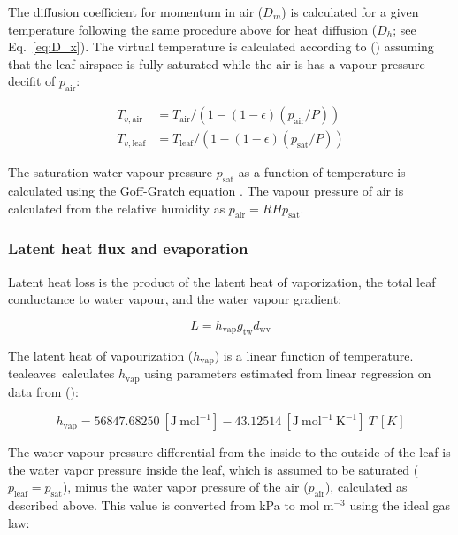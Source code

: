 \documentclass[11pt, oneside]{article}
\newcommand{\pkg}[1]{{\fontseries{b}\selectfont #1}}
\newcommand{\tealeaves}{\pkg{tealeaves}}
\begin{document}
The diffusion coefficient for momentum in air ($D_m$) is calculated for a given temperature following the same procedure above for heat diffusion ($D_h$; see Eq.~\ref{eq:D_x}). The virtual temperature is calculated according to \citeauthor{Monteith_Unsworth_2013} (\citeyear{Monteith_Unsworth_2013}) assuming that the leaf airspace is fully saturated while the air is has a vapour pressure decifit of $p_\mathrm{air}$:

\begin{align}
  T_{v, \mathrm{air}} & = T_\mathrm{air} / (1 - (1 - \epsilon) (p_\mathrm{air} / P)) \\
  T_{v, \mathrm{leaf}} & = T_\mathrm{leaf} / (1 - (1 - \epsilon) (p_\mathrm{sat} / P))
\end{align}

The saturation water vapour pressure $p_\mathrm{sat}$ as a function of temperature is calculated using the Goff-Gratch equation \citep{Vomel_2016}. The vapour pressure of air is calculated from the relative humidity as $p_\mathrm{air} = \mathit{RH} p_\mathrm{sat}$.

\subsubsection*{Latent heat flux and evaporation}

Latent heat loss is the product of the latent heat of vaporization, the total leaf conductance to water vapour, and the water vapour gradient:

\begin{equation}
  L = h_\mathrm{vap} g_\mathrm{tw} d_\mathrm{wv}
\end{equation}

The latent heat of vapourization ($h_\mathrm{vap}$) is a linear function of temperature. \tealeaves~calculates $h_\mathrm{vap}$ using parameters estimated from linear regression on data from \citeauthor{Nobel_2009} (\citeyear{Nobel_2009}):

\begin{equation}
  h_\mathrm{vap} = 56847.68250~[\mathrm{J~mol}^{-1}] - 43.12514~[\mathrm{J~mol}^{-1}~\mathrm{K}^{-1}]~T~[K]
\end{equation}

The water vapour pressure differential from the inside to the outside of the leaf is the water vapor pressure inside the leaf, which is assumed to be saturated ($p_\mathrm{leaf} = p_\mathrm{sat}$), minus the water vapor pressure of the air ($p_\mathrm{air}$), calculated as described above. This value is converted from kPa to mol m$^{-3}$ using the ideal gas law:
\end{document}
